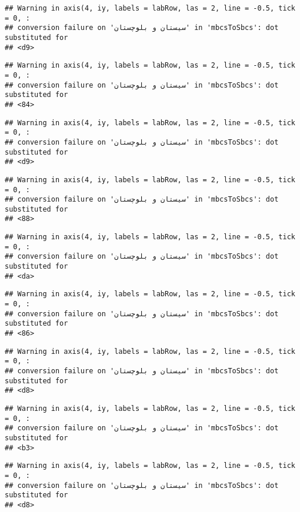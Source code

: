 \documentclass[
]{article}
\begin{document}
\begin{verbatim}
## Warning in axis(4, iy, labels = labRow, las = 2, line = -0.5, tick = 0, :
## conversion failure on 'سیستان و بلوچستان' in 'mbcsToSbcs': dot substituted for
## <d9>
\end{verbatim}

\begin{verbatim}
## Warning in axis(4, iy, labels = labRow, las = 2, line = -0.5, tick = 0, :
## conversion failure on 'سیستان و بلوچستان' in 'mbcsToSbcs': dot substituted for
## <84>
\end{verbatim}

\begin{verbatim}
## Warning in axis(4, iy, labels = labRow, las = 2, line = -0.5, tick = 0, :
## conversion failure on 'سیستان و بلوچستان' in 'mbcsToSbcs': dot substituted for
## <d9>
\end{verbatim}

\begin{verbatim}
## Warning in axis(4, iy, labels = labRow, las = 2, line = -0.5, tick = 0, :
## conversion failure on 'سیستان و بلوچستان' in 'mbcsToSbcs': dot substituted for
## <88>
\end{verbatim}

\begin{verbatim}
## Warning in axis(4, iy, labels = labRow, las = 2, line = -0.5, tick = 0, :
## conversion failure on 'سیستان و بلوچستان' in 'mbcsToSbcs': dot substituted for
## <da>
\end{verbatim}

\begin{verbatim}
## Warning in axis(4, iy, labels = labRow, las = 2, line = -0.5, tick = 0, :
## conversion failure on 'سیستان و بلوچستان' in 'mbcsToSbcs': dot substituted for
## <86>
\end{verbatim}

\begin{verbatim}
## Warning in axis(4, iy, labels = labRow, las = 2, line = -0.5, tick = 0, :
## conversion failure on 'سیستان و بلوچستان' in 'mbcsToSbcs': dot substituted for
## <d8>
\end{verbatim}

\begin{verbatim}
## Warning in axis(4, iy, labels = labRow, las = 2, line = -0.5, tick = 0, :
## conversion failure on 'سیستان و بلوچستان' in 'mbcsToSbcs': dot substituted for
## <b3>
\end{verbatim}

\begin{verbatim}
## Warning in axis(4, iy, labels = labRow, las = 2, line = -0.5, tick = 0, :
## conversion failure on 'سیستان و بلوچستان' in 'mbcsToSbcs': dot substituted for
## <d8>
\end{verbatim}
\end{document}
